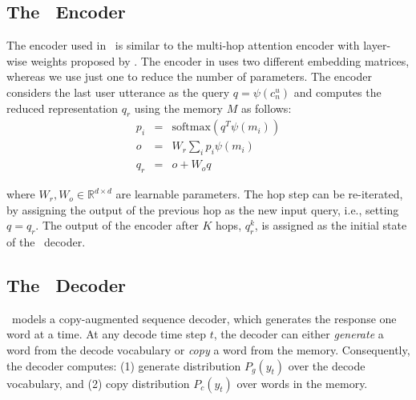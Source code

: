 
\subsection{The \sys\ Encoder}
\label{ssec:encoder}

The encoder used in \sys\ is similar to the multi-hop attention encoder with layer-wise weights proposed by \cite{sukhbaatar2015end}. The encoder in \cite{sukhbaatar2015end} uses two different embedding matrices, whereas we use just one to reduce the number of parameters. The encoder considers the last user utterance as the query $q=\psi(c_n^u)$ and computes the reduced representation $q_r$ using the memory $M$ as follows:
\begin{eqnarray}
p_i &=& \text{softmax}(q^T \psi(m_i)) \\
o &=& W_r \sum\nolimits_i p_i \psi(m_i) \\
q_r &=& o + W_o q
\end{eqnarray}

where $W_r, W_o \in \mathbb{R}^{d \times d}$ are learnable parameters. The hop step can be re-iterated, by assigning the output of the previous hop as the new input query, i.e., setting $q=q_r$. The output of the encoder after $K$ hops, $q_r^k$, is assigned as the initial state of the \sys\ decoder.

\subsection{The \sys\ Decoder}
\label{ssec:decoder}

\sys\ models a copy-augmented sequence decoder, which generates the response one word at a time. At any decode time step $t$, the decoder can either \emph{generate} a word from the decode vocabulary or \emph{copy} a word from the memory. Consequently, the decoder computes: (1) generate distribution $P_g(y_t)$ over the decode vocabulary, and (2) copy distribution $P_c(y_t)$ over words in the memory. 

